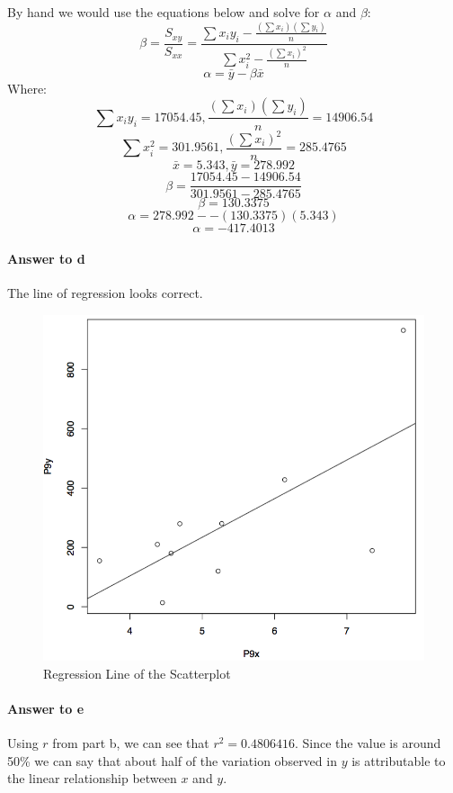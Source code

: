 \documentclass{article}
\newcommand{\p}[1]{\paragraph{#1}} %
\begin{document}
	By hand we would use the equations below and solve for $\alpha$ and $\beta$:
	\[ \beta = \frac{S_{xy}}{S_{xx}} = \frac{\sum x_iy_i - \frac{(\sum x_i)(\sum y_i)}{n}}{\sum x_i^2 - 
	\frac{(\sum x_i)^2}{n}} \]
	\[ \alpha = \bar{y} - \beta\bar{x} \]
	Where:
	\[ \sum x_iy_i = 17054.45, \frac{(\sum x_i)(\sum y_i)}{n} = 14906.54 \]
	\[ \sum x_i^2 = 301.9561, \frac{(\sum x_i)^2}{n} = 285.4765\]
	\[ \bar{x} = 5.343, \bar{y} = 278.992 \]
	\[ \beta = \frac{17054.45 - 14906.54}{301.9561 - 285.4765} \]
	\[ \beta = 130.3375 \]
	\[ \alpha = 278.992 -- (130.3375)(5.343) \]
	\[ \alpha = -417.4013 \]
	
	\clearpage
	\p{Answer to d} The line of regression looks correct.
	\begin{figure}[!htb]
	   \centering
	   \includegraphics[width=\textwidth]{img/Prob9d.jpg} 
	   \caption{Regression Line of the Scatterplot}
	   \label{fig:problem9_d}
	\end{figure}
	
	\p{Answer to e} %
	Using $r$ from part b, we can see that $r^2 = 0.4806416$. Since the value is around 50\% we 
	can say that about half of the variation observed in $y$ is attributable to the linear relationship 
	between $x$ and $y$.
\end{document}
